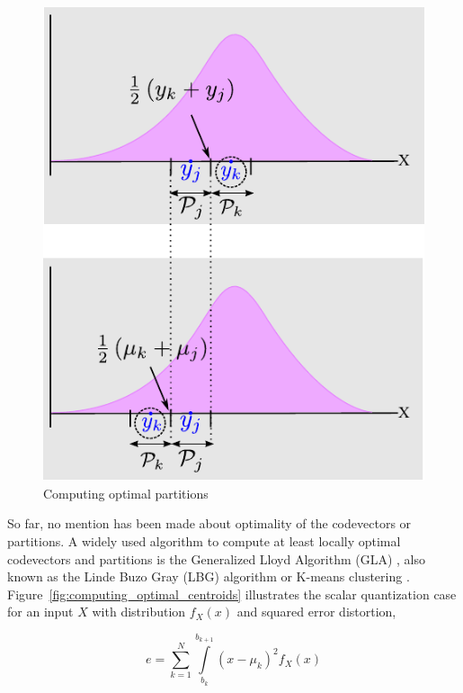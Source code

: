 								\begin{figure}[t]		
								\center	
								\includegraphics[height=0.5\textheight]{thesis/Quantization_optimalPartitions2.pdf}
								\caption{Computing optimal partitions}
								\label{fig:computing_optimal_partitions}
								\end{figure}

So far, no mention has been made about optimality of the codevectors or partitions.  A widely used algorithm to compute at least locally optimal codevectors and partitions is the Generalized Lloyd Algorithm (GLA) \cite{1991_BOOK_VQ_GershoGray}, also known as the Linde Buzo Gray (LBG) algorithm \cite{1982_JNL_LeastSquaresQuantization_Lloyd} or K-means clustering \cite{1967_CNF_Kmeans_Macqueen}.  Figure~\ref{fig:computing_optimal_centroids} illustrates the scalar quantization case for an input $X$ with distribution $f_X(x)$ and squared error distortion, 

\begin{equation}
e=\sum\limits_{k=1}^{N} \int\limits_{b_k}^{b_{k+1}}(x-\mu_k)^2f_X(x)
\end{equation}

